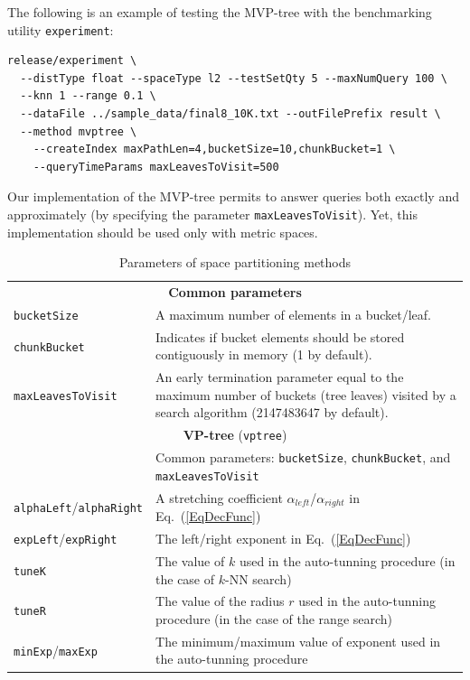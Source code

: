 \documentclass[runningheads,a4paper]{llncs}
\newcommand{\ttt}[1]{\texttt{#1}}
\newcommand{\knn}{$k$-NN }
\begin{document}
{The following is an example of testing the MVP-tree with the benchmarking utility \ttt{experiment}:
{
\footnotesize
\begin{verbatim}
release/experiment \
  --distType float --spaceType l2 --testSetQty 5 --maxNumQuery 100 \
  --knn 1 --range 0.1 \
  --dataFile ../sample_data/final8_10K.txt --outFilePrefix result \
  --method mvptree \
    --createIndex maxPathLen=4,bucketSize=10,chunkBucket=1 \
    --queryTimeParams maxLeavesToVisit=500
\end{verbatim}
}

Our implementation of the MVP-tree permits to answer queries both exactly and approximately (by specifying
the parameter \ttt{maxLeavesToVisit}). Yet, this implementation should be used only with metric spaces.

\begin{table}
\caption{Parameters of space partitioning methods\label{TableSpaceMethPart}}
\centering
\begin{tabular}{l@{\hspace{2mm}}p{3.5in}}
\toprule
\multicolumn{2}{c}{\textbf{Common parameters}}\\
\cmidrule(l){1-2} 
\ttt{bucketSize}    & A maximum number of elements in a bucket/leaf.    \\
\ttt{chunkBucket}   & Indicates if bucket elements should be stored contiguously in memory (1 by default).  \\
\ttt{maxLeavesToVisit}  & An early termination parameter equal to the maximum number of buckets (tree leaves) visited by a search algorithm (2147483647 by default). \\
\cmidrule(l){1-2} 
\multicolumn{2}{c}{\textbf{VP-tree} (\ttt{vptree}) \cite{Uhlmann:1991,Yianilos:1993}  } 
\\
\cmidrule(l){1-2} 
                   & Common parameters: \ttt{bucketSize}, \ttt{chunkBucket}, and \ttt{maxLeavesToVisit} \\
 \ttt{alphaLeft}/\ttt{alphaRight}   & A stretching coefficient $\alpha_{left}$/$\alpha_{right}$ in Eq.~(\ref{EqDecFunc}) \\
 \ttt{expLeft}/\ttt{expRight} & The left/right exponent in Eq.~(\ref{EqDecFunc}) \\
 \ttt{tuneK}       & The value of $k$ used in the auto-tunning procedure (in the case of \knn search) \\
 \ttt{tuneR}       & The value of the radius $r$ used in the auto-tunning procedure (in the case of the range search) \\
 \ttt{minExp}/\ttt{maxExp} & The minimum/maximum value of exponent used in the auto-tunning procedure \\

\end{tabular}
\end{table}}
\end{document}

